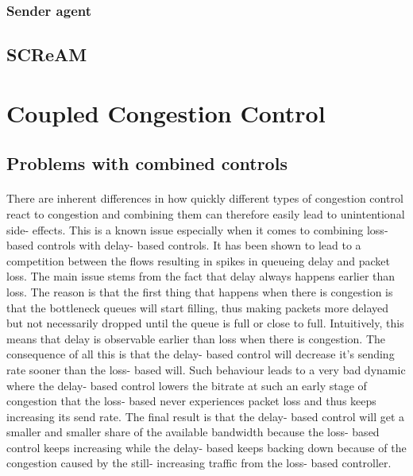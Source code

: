 \documentclass[UKenglish]{ifimaster}
\begin{document}
\subsubsection{Sender agent}

\subsection{SCReAM}


\section{Coupled Congestion Control}
\subsection{Problems with combined controls}
\paragraph{}
There are inherent differences in how quickly different types of congestion control react to congestion and combining them can therefore easily lead to unintentional side- effects. 
This is a known issue especially when it comes to combining loss- based controls with delay- based controls.
It has been shown to lead to a competition between the flows resulting in spikes in queueing delay and packet loss. 
The main issue stems from the fact that delay always happens earlier than loss.
The reason is that the first thing that happens when there is congestion is that the bottleneck queues will start filling, thus making packets more delayed but not necessarily dropped until the queue is full or close to full.
Intuitively, this means that delay is observable earlier than loss when there is congestion.
The consequence of all this is that the delay- based control will decrease it's sending rate sooner than the loss- based will. 
Such behaviour leads to a very bad dynamic where the delay- based control lowers the bitrate at such an early stage of congestion that the loss- based never experiences packet loss and thus keeps increasing its send rate. 
The final result is that the delay- based control will get a smaller and smaller share of the available bandwidth because the loss- based control keeps increasing while the delay- based keeps backing down because of the congestion caused by the still- increasing traffic from the loss- based controller.
\end{document}
